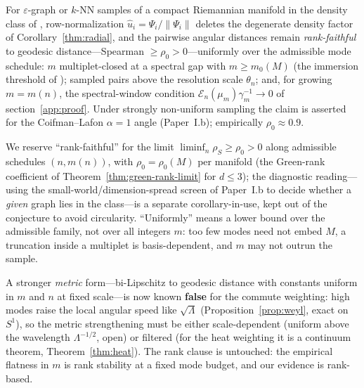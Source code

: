 \documentclass[review]{siamart220329}
\begin{document}
\begin{conjecture}\label{conj:angle}
For $\varepsilon$-graph or $k$-NN samples of a compact Riemannian manifold in the
density class of \cite{garciatrillos2018,calder2022}, row-normalization
$\hat u_i=\Psi_i/\lVert\Psi_i\rVert$ deletes the degenerate density factor of
Corollary~\ref{thm:radial}, and the pairwise angular distances remain
\emph{rank-faithful} to geodesic distance---Spearman $\ge\rho_0>0$---uniformly over
the admissible mode schedule: $m$ multiplet-closed at a spectral gap with
$m\ge m_0(M)$ (the immersion threshold of \cite{bates2014,portegies2016}); sampled
pairs above the resolution scale $\theta_n$; and, for growing $m=m(n)$, the
spectral-window condition $\mathcal E_n(\mu_m)\gamma_m^{-1}\to0$ of
section~\ref{app:proof}. Under strongly non-uniform sampling the claim is asserted
for the Coifman--Lafon $\alpha{=}1$ angle (Paper~I.b); empirically
$\rho_0\approx0.9$.
\end{conjecture}

We reserve ``rank-faithful'' for the limit $\liminf_{n}\rho_S\ge\rho_0>0$ along
admissible schedules $(n,m(n))$, with $\rho_0=\rho_0(M)$ per manifold (the
Green-rank coefficient of Theorem~\ref{thm:green-rank-limit} for $d\le3$); the
diagnostic reading---using the small-world/dimension-spread screen of Paper~I.b to
decide whether a \emph{given} graph lies in the class---is a separate
corollary-in-use, kept out of the conjecture to avoid circularity. ``Uniformly''
means a lower bound over the admissible family, not over all integers $m$: too few
modes need not embed $M$, a truncation inside a multiplet is basis-dependent, and
$m$ may not outrun the sample.

A stronger \emph{metric} form---bi-Lipschitz to geodesic distance with constants
uniform in $m$ and $n$ at fixed scale---is now known \textbf{false} for the commute
weighting: high modes raise the local angular speed like $\sqrt\Lambda$
(Proposition~\ref{prop:weyl}, exact on $S^1$), so the metric strengthening must be
either scale-dependent (uniform above the wavelength $\Lambda^{-1/2}$, open) or
filtered (for the heat weighting it is a continuum theorem,
Theorem~\ref{thm:heat}). The rank clause is untouched: the empirical flatness in
$m$ is rank stability at a fixed mode budget, and our evidence is rank-based.
\end{document}
